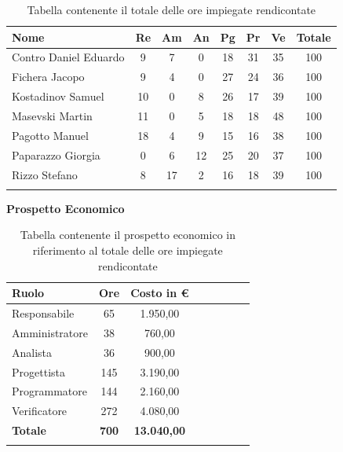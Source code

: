 \documentclass[../piano_di_progetto.tex]{subfiles}
\begin{document}
\begin{center}
	\begin{longtable}{|l|c|c|c|c|c|c|c|}
		\hline
		\rowcolor{lightgray}
		\textbf{Nome} & \textbf{Re} & \textbf{Am} & \textbf{An} & \textbf{Pg}  & \textbf{Pr}   & \textbf{Ve} & \textbf{Totale} \\

		\hline
			Contro Daniel Eduardo & 9 & 7 & 0 & 18 & 31 & 35 & 100 \\
		\hline
			Fichera Jacopo & 9 & 4 & 0 & 27 & 24 & 36 & 100 \\
		\hline
			Kostadinov Samuel & 10 & 0 & 8 & 26 & 17 & 39 & 100 \\		
		\hline
			Masevski Martin & 11 & 0 & 5 & 18 & 18 & 48 & 100 \\
		\hline
			Pagotto Manuel & 18 & 4 & 9 & 15 & 16 & 38 & 100 \\			
		\hline
			Paparazzo Giorgia & 0 & 6 & 12 & 25 & 20 & 37 & 100 \\
		\hline
			Rizzo Stefano & 8 & 17 & 2 & 16 & 18 & 39 & 100 \\
		\hline	

		\caption{Tabella contenente il totale delle ore impiegate rendicontate}
	\end{longtable}
\end{center}

\textbf{Prospetto Economico}

\begin{center}
	\begin{longtable}{|l|c|c|c|c|c|c|c|}
		\hline
		\rowcolor{lightgray}
		\textbf{Ruolo} & \textbf{Ore} & \textbf{Costo in €}\\

		\hline
		Responsabile & 65 & 1.950,00 \\
		\hline
		Amministratore & 38 & 760,00 \\
		\hline
		Analista & 36 & 900,00 \\
		\hline
		Progettista & 145 & 3.190,00 \\
		\hline
		Programmatore & 144 & 2.160,00 \\
		\hline
		Verificatore & 272 & 4.080,00 \\
		\hline
		\textbf{Totale} & \textbf{700} & \textbf{13.040,00}\\
		\hline
		\caption{Tabella contenente il prospetto economico in riferimento al totale delle ore impiegate rendicontate}
	\end{longtable}
\end{center}
\end{document}
